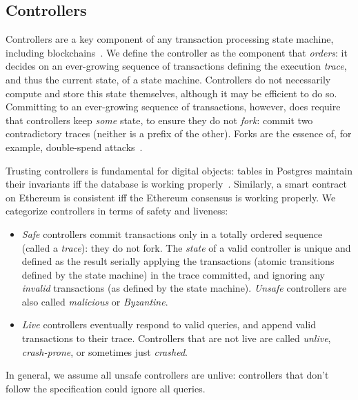 \documentclass[a4paper,USenglish,cleveref, autoref, thm-restate, anonymous]{lipics-v2021}
\begin{document}
\subsection{Controllers}  
Controllers are a key component of any transaction processing state machine, including blockchains~\cite{smr,statemachine}.
We define the controller as the component that \emph{orders}: it decides on an ever-growing sequence of transactions defining the execution \emph{trace}, and thus the current state, of a state machine.
Controllers do not necessarily compute and store this state themselves, although it may be efficient to do so.
Committing to an ever-growing sequence of transactions, however, does require that controllers keep \textit{some} state, to ensure they do not \emph{fork}: commit two contradictory traces (neither is a prefix of the other).
Forks are the essence of, for example, double-spend attacks~\cite{Abraham2017}.

Trusting controllers is fundamental for digital objects: tables in Postgres maintain their invariants iff the database is working properly~\cite{constraints}.
Similarly, a smart contract on Ethereum is consistent iff the Ethereum consensus is working properly\cite{ethereum}.
We categorize controllers in terms of safety and liveness:
\begin{itemize}
\item \emph{Safe} controllers commit transactions only in a totally ordered sequence (called a \emph{trace}): they do not fork.
The \emph{state} of a valid controller is unique and defined as the result serially applying the transactions (atomic transitions defined by the state machine) in the trace committed, and ignoring any \emph{invalid} transactions (as defined by the state machine).
  \emph{Unsafe} controllers are also called \emph{malicious} or \emph{Byzantine}.  
\item \emph{Live} controllers eventually respond to valid queries, and append valid transactions to their trace.
  Controllers that are not live are called \emph{unlive}, \emph{crash-prone}, or sometimes just \emph{crashed}.
\end{itemize}
In general, we assume all unsafe controllers are unlive: controllers that don't follow the specification could ignore all queries.
\end{document}
